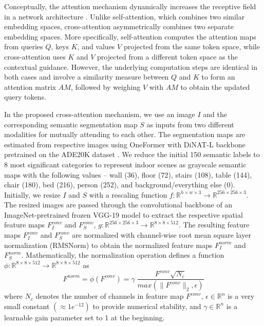 Conceptually, the attention mechanism \cite{vaswani2017attention} dynamically increases the receptive field in a network architecture \cite{wang2018non}. Unlike self-attention, which combines two similar embedding spaces, cross-attention asymmetrically combines two separate embedding spaces. More specifically, self-attention computes the attention maps from queries $Q$, keys $K$, and values $V$ projected from the same token space, while cross-attention uses $K$ and $V$ projected from a different token space as the contextual guidance. However, the underlying computation steps are identical in both cases and involve a similarity measure between $Q$ and $K$ to form an attention matrix $AM$, followed by weighing $V$ with $AM$ to obtain the updated query tokens.

In the proposed cross-attention mechanism, we use an image $I$ and the corresponding semantic segmentation map $S$ as inputs from two different modalities for mutually attending to each other. The segmentation maps are estimated from respective images using OneFormer \cite{jain2023oneformer} with DiNAT-L \cite{hassani2022dilated} backbone pretrained on the ADE20K dataset \cite{zhou2019semantic}. We reduce the initial 150 semantic labels to 8 most significant categories to represent indoor scenes as grayscale semantic maps with the following values -- wall (36), floor (72), stairs (108), table (144), chair (180), bed (216), person (252), and background/everything else (0). Initially, we resize $I$ and $S$ with a rescaling function $f: \mathbb{R}^{h \times w \times 3} \rightarrow \mathbb{R}^{256 \times 256 \times 3}$. The resized images are passed through the convolutional backbone of an ImageNet-pretrained \cite{deng2009imagenet} frozen VGG-19 model \cite{simonyan2015very} to extract the respective spatial feature maps $F^{conv}_I$ and $F^{conv}_S$, $g: \mathbb{R}^{256 \times 256 \times 3} \rightarrow \mathbb{R}^{8 \times 8 \times 512}$. The resulting feature maps $F^{conv}_I$ and $F^{conv}_S$ are normalized with channel-wise root mean square layer normalization (RMSNorm) \cite{zhang2019root} to obtain the normalized feature maps $F^{norm}_I$ and $F^{norm}_S$. Mathematically, the normalization operation defines a function $\phi: \mathbb{R}^{8 \times 8 \times 512} \rightarrow \mathbb{R}^{8 \times 8 \times 512}$ as
\[
F^{norm} = \phi(F^{conv}) = \gamma \; \frac{F^{conv} \sqrt{N_c}}{max(\|F^{conv}\|_2, \epsilon)}
\]
where $N_c$ denotes the number of channels in feature map $F^{conv}$, $\epsilon \in \mathbb{R}^n$ is a very small constant $(\approx 1e^{-12})$ to provide numerical stability, and $\gamma \in \mathbb{R}^n$ is a learnable gain parameter set to 1 at the beginning.

